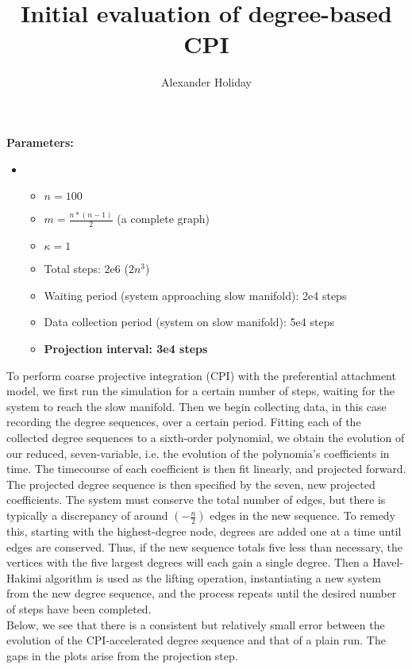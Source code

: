 \documentclass[11pt]{article}
\begin{document}
\title{\vspace{-5mm}Initial evaluation of degree-based CPI}
\author{Alexander Holiday}
\maketitle

\textbf{Parameters:}
\begin{itemize}[label=]
\item \begin{itemize}[label=-]
\item $n=100$
  \item $m=\frac{n*(n-1)}{2}$ (a complete graph)
  \item $\kappa=1$
  \item Total steps: 2e6 ($2n^3$)
  \item Waiting period (system approaching slow manifold): 2e4 steps
  \item Data collection period (system on slow manifold): 5e4 steps
  \item  \textbf{Projection interval: 3e4 steps}
\end{itemize}
\end{itemize}

To perform coarse projective integration (CPI) with the preferential attachment model, we first run the simulation for a certain number of steps, waiting for the system to reach the slow manifold. Then we begin collecting data, in this case recording the degree sequences, over a certain period. Fitting each of the collected degree sequences to a sixth-order polynomial, we obtain the evolution of our reduced, seven-variable, i.e. the evolution of the polynomia's coefficients in time. The timecourse of each coefficient is then fit linearly, and projected forward. The projected degree sequence is then specified by the seven, new projected coefficients. The system must conserve the total number of edges, but there is typically a discrepancy of around $(-\frac{n}{2})$ edges in the new sequence. To remedy this, starting with the highest-degree node, degrees are added one at a time until edges are conserved. Thus, if the new sequence totals five less than necessary, the vertices with the five largest degrees will each gain a single degree. Then a Havel-Hakimi algorithm is used as the lifting operation, instantiating a new system from the new degree sequence, and the process repeats until the desired number of steps have been completed. \\

Below, we see that there is a consistent but relatively small error between the evolution of the CPI-accelerated degree sequence and that of a plain run. The gaps in the plots arise from the projection step.
\end{document}

